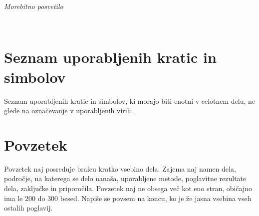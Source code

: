 \documentclass[12pt,a4paper,openany]{book}
\begin{document}
\newpage


\thispagestyle{empty}

$\;$ 

\vspace{5cm}
\hfill {\Large \em Morebitno posvetilo}
\thispagestyle{empty}

\newpage



\ \thispagestyle{empty}

\newpage


\renewcommand\thepage{} 
\tableofcontents 
\renewcommand\thepage{\arabic{page}}

\thispagestyle{empty}



\chapter*{Seznam uporabljenih kratic in simbolov}

\thispagestyle{empty}

Seznam uporabljenih kratic in simbolov, ki morajo biti enotni v celotnem delu, ne glede na označevanje v uporabljenih virih.


\clearpage{\pagestyle{empty}\cleardoublepage}


\setcounter{page}{1}

\chapter*{Povzetek}


Povzetek naj posreduje bralcu kratko vsebino dela. Zajema naj namen dela, področje, na katerega se delo nanaša,
uporabljene metode, poglavitne rezultate dela, zaključke in priporočila. 
Povzetek naj ne obsega več kot eno stran, obi\v cajno ima le 200 do 300 besed. Napiše se povsem na koncu,
ko je že jasna vsebina vseh ostalih poglavij.
\end{document}
